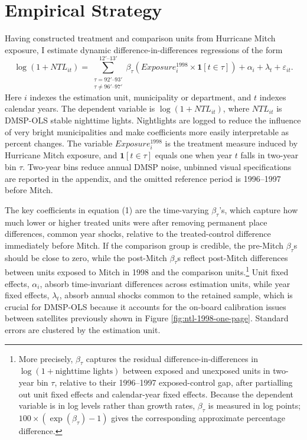 \documentclass[12pt]{article}
\begin{document}
\section{Empirical Strategy}

Having constructed treatment and comparison units from Hurricane Mitch exposure, I estimate dynamic difference-in-differences regressions of the form
\begin{equation}
    \log(1+NTL_{it})
    =
    \sum_{\substack{\tau=92'\text{--}93'\\ \tau\neq 96'\text{--}97'}}^{12'\text{--}13'}
    \beta_{\tau}
    \left(Exposure_i^{1998}\times \mathbf{1}[t\in \tau]\right)
    +\alpha_i+\lambda_t+\varepsilon_{it}.
\end{equation}
Here $i$ indexes the estimation unit, municipality or department, and $t$ indexes calendar years. The dependent variable is $\log(1+NTL_{it})$, where $NTL_{it}$ is DMSP-OLS stable nighttime lights. Nightlights are logged to reduce the influence of very bright municipalities and make coefficients more easily interpretable as percent changes. The variable $Exposure_i^{1998}$ is the treatment measure induced by Hurricane Mitch exposure, and $\mathbf{1}[t\in\tau]$ equals one when year $t$ falls in two-year bin $\tau$. Two-year bins reduce annual DMSP noise, unbinned visual specifications are reported in the appendix, and the omitted reference period is 1996--1997 before Mitch.

The key coefficients in equation (1) are the time-varying $\beta_\tau$'s, which capture how much lower or higher treated units were after removing permanent place differences, common year shocks, relative to the treated-control difference immediately before Mitch. If the comparison group is credible, the pre-Mitch $\beta_\tau$s should be close to zero, while the post-Mitch $\beta_\tau$s reflect post-Mitch differences between units exposed to Mitch in 1998 and the comparison units.\footnote{More precisely, $\beta_\tau$ captures the residual difference-in-differences in $\log(1+\text{nighttime lights})$ between exposed and unexposed units in two-year bin $\tau$, relative to their 1996--1997 exposed-control gap, after partialling out unit fixed effects and calendar-year fixed effects. Because the dependent variable is in log levels rather than growth rates, $\beta_\tau$ is measured in log points; $100\times(\exp(\beta_\tau)-1)$ gives the corresponding approximate percentage difference.} Unit fixed effects, $\alpha_i$, absorb time-invariant differences across estimation units, while year fixed effects, $\lambda_t$, absorb annual shocks common to the retained sample, which is crucial for DMSP-OLS because it accounts for the on-board calibration issues between satellites previously shown in Figure \ref{fig:ntl-1998-one-page}. Standard errors are clustered by the estimation unit.
\end{document}
